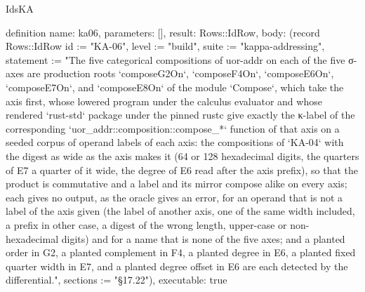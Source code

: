 \begin{lexlean}{IdsKA}
\begin{semanticmodule}
definition{
  name: ka06,
  parameters: [],
  result: Rows::IdRow,
  body: (record Rows::IdRow {id := "KA-06", level := "build", suite := "kappa-addressing", statement := "The five categorical compositions of uor-addr on each of the five σ-axes are production roots `composeG2On`, `composeF4On`, `composeE6On`, `composeE7On`, and `composeE8On` of the module `Compose`, which take the axis first, whose lowered program under the calculus evaluator and whose rendered `rust-std` package under the pinned rustc give exactly the κ-label of the corresponding `uor_addr::composition::compose_*` function of that axis on a seeded corpus of operand labels of each axis: the compositions of `KA-04` with the digest as wide as the axis makes it (64 or 128 hexadecimal digits, the quarters of E7 a quarter of it wide, the degree of E6 read after the axis prefix), so that the product is commutative and a label and its mirror compose alike on every axis; each gives no output, as the oracle gives an error, for an operand that is not a label of the axis given (the label of another axis, one of the same width included, a prefix in other case, a digest of the wrong length, upper-case or non-hexadecimal digits) and for a name that is none of the five axes; and a planted order in G2, a planted complement in F4, a planted degree in E6, a planted fixed quarter width in E7, and a planted degree offset in E6 are each detected by the differential.", sections := "§17.22"}),
  executable: true
}
\end{semanticmodule}
\end{lexlean}
